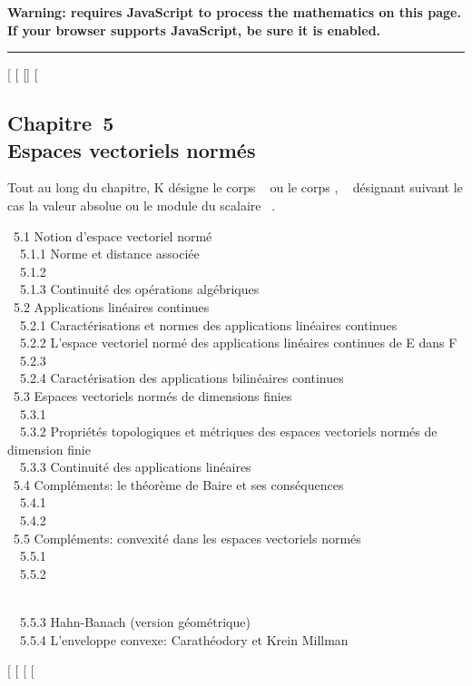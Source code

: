 \textbf{Warning: 
requires JavaScript to process the mathematics on this page.\\ If your
browser supports JavaScript, be sure it is enabled.}

\begin{center}\rule{3in}{0.4pt}\end{center}

{[}
{[}
{[}{]}
{[}

\subsection{Chapitre~5\\Espaces vectoriels normés}

Tout au long du chapitre, K désigne le corps ~ ou le corps ,
\textbar{}\lambda~\textbar{} désignant suivant le cas la valeur absolue ou le
module du scalaire \lambda~.

~5.1 {Notion d'espace vectoriel
normé} \\ ~~5.1.1 {Norme et
distance associée} \\ ~~5.1.2
 \\ ~~5.1.3
{Continuité des opérations
algébriques} \\ ~5.2 {Applications
linéaires continues} \\ ~~5.2.1
{Caractérisations et normes des
applications linéaires continues} \\ ~~5.2.2
{L'espace vectoriel normé des
applications linéaires continues de E dans F} \\ ~~5.2.3
 \\
~~5.2.4 {Caractérisation des
applications bilinéaires continues} \\ ~5.3
{Espaces vectoriels normés de
dimensions finies} \\ ~~5.3.1
 \\
~~5.3.2 {Propriétés topologiques
et métriques des espaces vectoriels normés de dimension finie} \\
~~5.3.3 {Continuité des
applications linéaires} \\ ~5.4
{Compléments: le théorème de Baire
et ses conséquences} \\ ~~5.4.1
 \\ ~~5.4.2
 \\ ~5.5
{Compléments: convexité dans les
espaces vectoriels normés} \\ ~~5.5.1
 \\ ~~5.5.2

\\ ~~5.5.3 {Hahn-Banach (version
géométrique)} \\ ~~5.5.4
{L'enveloppe convexe: Carathéodory
et Krein Millman}

{[}
{[}
{[}
{[}
